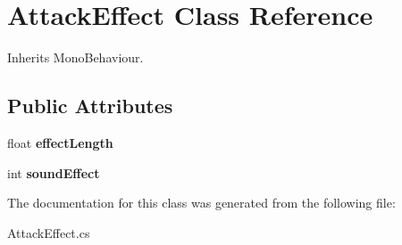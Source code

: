 \hypertarget{class_attack_effect}{}\section{Attack\+Effect Class Reference}
\label{class_attack_effect}


Inherits Mono\+Behaviour.

\subsection*{Public Attributes}
\begin{DoxyCompactItemize}
\item 
\mbox{\label{class_attack_effect_a21954640833b769610e13ded0e78d4cd}} 
float {\bfseries effect\+Length}
\item 
\mbox{\label{class_attack_effect_a6da8b558f3345a9b2a9ea26cec7c44af}} 
int {\bfseries sound\+Effect}
\end{DoxyCompactItemize}


The documentation for this class was generated from the following file\+:\begin{DoxyCompactItemize}
\item 
Attack\+Effect.\+cs\end{DoxyCompactItemize}
